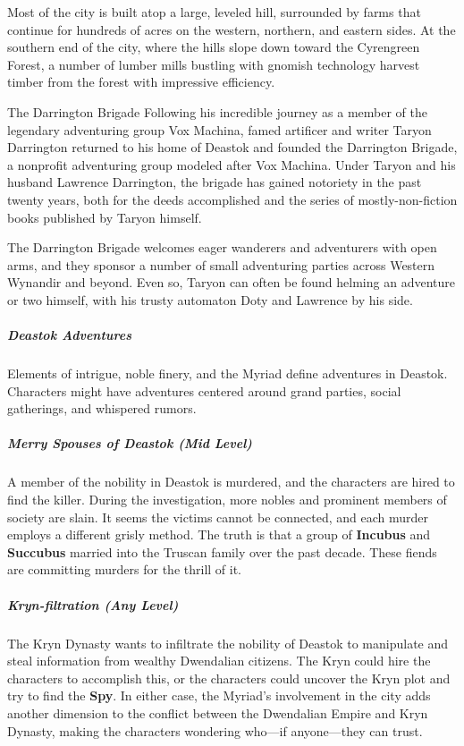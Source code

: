 \documentclass[10pt,a4paper,twoside,bg=print,twocolumn,openany,nodeprecatedcode]{dndbook}
\begin{document}
Most of the city is built atop a large, leveled hill, surrounded by farms that continue for hundreds of acres on the western, northern, and eastern sides. At the southern end of the city, where the hills slope down toward the Cyrengreen Forest, a number of lumber mills bustling with gnomish technology harvest timber from the forest with impressive efficiency.

\begin{DndSidebar}[float=!b]{The Darrington Brigade}
Following his incredible journey as a member of the legendary adventuring group Vox Machina, famed artificer and writer Taryon Darrington returned to his home of Deastok and founded the Darrington Brigade, a nonprofit adventuring group modeled after Vox Machina. Under Taryon and his husband Lawrence Darrington, the brigade has gained notoriety in the past twenty years, both for the deeds accomplished and the series of mostly-non-fiction books published by Taryon himself.



The Darrington Brigade welcomes eager wanderers and adventurers with open arms, and they sponsor a number of small adventuring parties across Western Wynandir and beyond. Even so, Taryon can often be found helming an adventure or two himself, with his trusty automaton Doty and Lawrence by his side.



\end{DndSidebar}

\subparagraph{Deastok Adventures}
Elements of intrigue, noble finery, and the Myriad define adventures in Deastok. Characters might have adventures centered around grand parties, social gatherings, and whispered rumors.

\subparagraph{Merry Spouses of Deastok (Mid Level)}
A member of the nobility in Deastok is murdered, and the characters are hired to find the killer. During the investigation, more nobles and prominent members of society are slain. It seems the victims cannot be connected, and each murder employs a different grisly method. The truth is that a group of \textbf{Incubus} and \textbf{Succubus} married into the Truscan family over the past decade. These fiends are committing murders for the thrill of it.

\subparagraph{Kryn-filtration (Any Level)}
The Kryn Dynasty wants to infiltrate the nobility of Deastok to manipulate and steal information from wealthy Dwendalian citizens. The Kryn could hire the characters to accomplish this, or the characters could uncover the Kryn plot and try to find the \textbf{Spy}. In either case, the Myriad's involvement in the city adds another dimension to the conflict between the Dwendalian Empire and Kryn Dynasty, making the characters wondering who—if anyone—they can trust.
\end{document}
